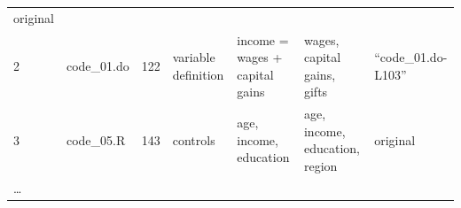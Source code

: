 \documentclass[]{book}
\begin{document}
\begin{longtable}[]{@{}lllllll@{}}
\begin{minipage}[t]{0.12\columnwidth}
original\strut
\end{minipage}\tabularnewline
\begin{minipage}[t]{0.05\columnwidth}\raggedright
2\strut
\end{minipage} & \begin{minipage}[t]{0.07\columnwidth}\raggedright
code\_01.do\strut
\end{minipage} & \begin{minipage}[t]{0.08\columnwidth}\raggedright
122\strut
\end{minipage} & \begin{minipage}[t]{0.12\columnwidth}\raggedright
variable definition\strut
\end{minipage} & \begin{minipage}[t]{0.19\columnwidth}\raggedright
income = wages + capital gains\strut
\end{minipage} & \begin{minipage}[t]{0.18\columnwidth}\raggedright
wages, capital gains, gifts\strut
\end{minipage} & \begin{minipage}[t]{0.12\columnwidth}\raggedright
``code\_01.do-L103''\strut
\end{minipage}\tabularnewline
\begin{minipage}[t]{0.05\columnwidth}\raggedright
3\strut
\end{minipage} & \begin{minipage}[t]{0.07\columnwidth}\raggedright
code\_05.R\strut
\end{minipage} & \begin{minipage}[t]{0.08\columnwidth}\raggedright
143\strut
\end{minipage} & \begin{minipage}[t]{0.12\columnwidth}\raggedright
controls\strut
\end{minipage} & \begin{minipage}[t]{0.19\columnwidth}\raggedright
age, income, education\strut
\end{minipage} & \begin{minipage}[t]{0.18\columnwidth}\raggedright
age, income, education, region\strut
\end{minipage} & \begin{minipage}[t]{0.12\columnwidth}\raggedright
original\strut
\end{minipage}\tabularnewline
\begin{minipage}[t]{0.05\columnwidth}\raggedright
\ldots{}\strut
\end{minipage} & \begin{minipage}[t]{0.07\columnwidth}\raggedright

\end{minipage}
\end{longtable}
\end{document}
